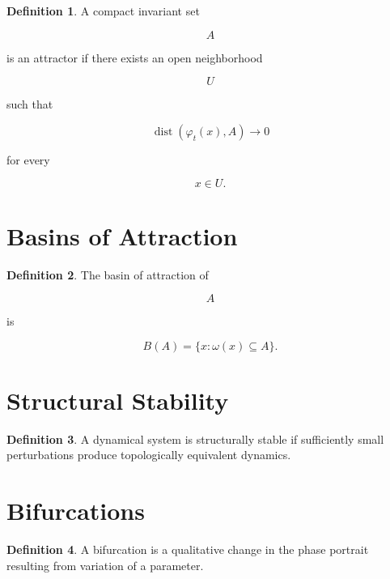 \documentclass[11pt]{book}
\numberwithin{equation}{chapter}
\theoremstyle{definition}
\newtheorem{definition}{Definition}[chapter]
\theoremstyle{plain}
\begin{document}
\begin{definition}

A compact invariant set

\[
A
\]

is an attractor if there exists an open neighborhood

\[
U
\]

such that

\[
\operatorname{dist}
(\varphi_t(x),A)
\rightarrow0
\]

for every

\[
x\in U.
\]

\end{definition}


\section{Basins of Attraction}

\begin{definition}

The basin of attraction of

\[
A
\]

is

\[
B(A)
=
\{
x
:
\omega(x)
\subseteq A
\}.
\]

\end{definition}


\section{Structural Stability}

\begin{definition}

A dynamical system is structurally stable if sufficiently small
perturbations produce topologically equivalent dynamics.

\end{definition}


\section{Bifurcations}

\begin{definition}

A bifurcation is a qualitative change in the phase portrait resulting
from variation of a parameter.

\end{definition}
\end{document}
